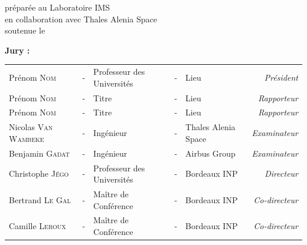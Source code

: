 \begin{titlepage}
\begin{center}
            \vspace*{1.5em}
            \noindent \Large préparée au Laboratoire IMS \\ en collaboration avec Thales Alenia Space \\
            \vspace*{1.5em}
            \noindent \large soutenue le \\
            \vspace*{1.5em}
          \end{center}
          \noindent \large \textbf{Jury :} \\
          \vspace*{-1.5em}
          \begin{center}
            \begin{tabular}{lclclr}
              Prénom \textsc{Nom}         & - & Professeur des Universités & - & Lieu                & \textit{Président}   \\
              Prénom \textsc{Nom}         & - & Titre                       & - & Lieu                & \textit{Rapporteur}   \\
              Prénom \textsc{Nom}         & - & Titre                       & - & Lieu                & \textit{Rapporteur}   \\
              Nicolas \textsc{Van Wambeke} & - & Ingénieur                  & - & Thales Alenia Space & \textit{Examinateur}  \\
              Benjamin \textsc{Gadat}      & - & Ingénieur                  & - & Airbus Group        & \textit{Examinateur}  \\
              Christophe \textsc{Jégo}    & - & Professeur des Universités & - & Bordeaux INP        & \textit{Directeur}    \\
              Bertrand \textsc{Le Gal}     & - & Maître de Conférence      & - & Bordeaux INP        & \textit{Co-directeur} \\
              Camille \textsc{Leroux}      & - & Maître de Conférence      & - & Bordeaux INP        & \textit{Co-directeur} \\
            \end{tabular}
          \end{center}
          
          
          
        \end{titlepage}
        
